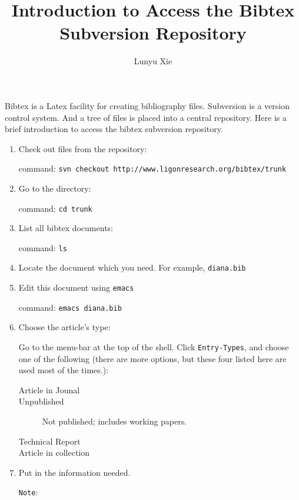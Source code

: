 \documentclass{article}
\begin{document}
\title{Introduction to Access the Bibtex Subversion Repository}
\author{Lunyu Xie}
\maketitle

Bibtex is a Latex facility for creating bibliography files. Subversion is a version control system. And a tree of files is placed into a central repository. Here is a brief introduction to access the bibtex subversion repository.

\begin{enumerate}
\item{Check out files from the repository:

command: \texttt{svn checkout http://www.ligonresearch.org/bibtex/trunk}}

\item{Go to the directory:

command: \texttt{cd trunk}}


\item{List all bibtex documents:

command: \texttt{ls}}


\item{Locate the document which you need. For example, \texttt{diana.bib}}


\item{Edit this document using \texttt{emacs}

command: \texttt{emacs diana.bib}}


\item{Choose the article's type:

    Go to the menu-bar at the top of the shell. Click
    \texttt{Entry-Types}, and choose one of the following (there are more options, but these four listed here are used most of the times.):
    \begin{description}
    \item[Article in Jounal]
    \item[Unpublished]{Not published; includes working papers.}
    \item[Technical Report]
    \item[Article in collection]
    \end{description}}

\item{Put in the information needed.

\texttt{Note}: 

}
\end{enumerate}
\end{document}

